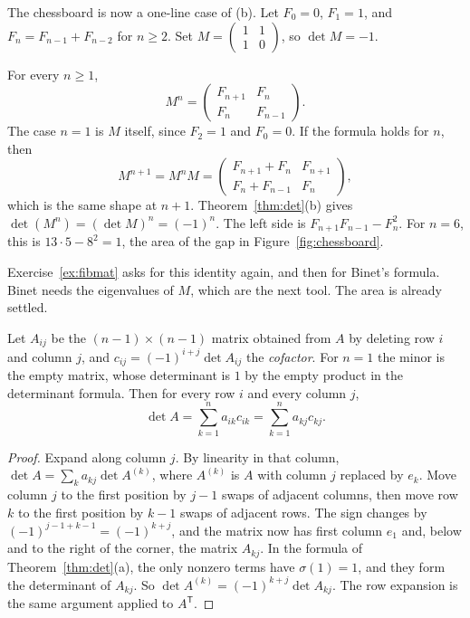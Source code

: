 The chessboard is now a one-line case of (b). Let $F_0=0$, $F_1=1$, and $F_n=F_{n-1}+F_{n-2}$ for $n\ge2$. Set $M=\begin{pmatrix}1&1\\1&0\end{pmatrix}$, so $\det M=-1$.

\begin{examplex}
For every $n\ge1$,
\[
M^n=\begin{pmatrix}F_{n+1}&F_n\\F_n&F_{n-1}\end{pmatrix}.
\]
The case $n=1$ is $M$ itself, since $F_2=1$ and $F_0=0$. If the formula holds for $n$, then
\[
M^{n+1}=M^nM=\begin{pmatrix}F_{n+1}+F_n&F_{n+1}\\F_n+F_{n-1}&F_n\end{pmatrix},
\]
which is the same shape at $n+1$. Theorem~\ref{thm:det}(b) gives $\det(M^n)=(\det M)^n=(-1)^n$. The left side is $F_{n+1}F_{n-1}-F_n^2$. For $n=6$, this is $13\cdot5-8^2=1$, the area of the gap in Figure~\ref{fig:chessboard}.
\end{examplex}

Exercise~\ref{ex:fibmat} asks for this identity again, and then for Binet's formula. Binet needs the eigenvalues of $M$, which are the next tool. The area is already settled.

\begin{propositionx}
Let $A_{ij}$ be the $(n-1)\times(n-1)$ matrix obtained from $A$ by deleting row $i$ and column $j$, and $c_{ij}=(-1)^{i+j}\det A_{ij}$ the \emph{cofactor}. For $n=1$ the minor is the empty matrix, whose determinant is $1$ by the empty product in the determinant formula. Then for every row $i$ and every column $j$,
\[
\det A=\sum_{k=1}^na_{ik}c_{ik}=\sum_{k=1}^na_{kj}c_{kj}.
\]
\end{propositionx}
\begin{proof}
Expand along column $j$. By linearity in that column, $\det A=\sum_ka_{kj}\det A^{(k)}$, where $A^{(k)}$ is $A$ with column $j$ replaced by $e_k$. Move column $j$ to the first position by $j-1$ swaps of adjacent columns, then move row $k$ to the first position by $k-1$ swaps of adjacent rows. The sign changes by $(-1)^{j-1+k-1}=(-1)^{k+j}$, and the matrix now has first column $e_1$ and, below and to the right of the corner, the matrix $A_{kj}$. In the formula of Theorem~\ref{thm:det}(a), the only nonzero terms have $\sigma(1)=1$, and they form the determinant of $A_{kj}$. So $\det A^{(k)}=(-1)^{k+j}\det A_{kj}$. The row expansion is the same argument applied to $A^{\mathsf T}$.
\end{proof}

